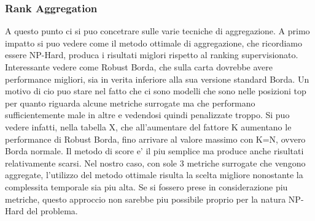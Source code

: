 \subsubsection{Rank Aggregation}
A questo punto ci si puo concetrare sulle varie tecniche di aggregazione. A primo impatto si puo vedere come il metodo ottimale di aggregazione, che ricordiamo essere NP-Hard, produca i risultati miglori rispetto al ranking supervisionato. Interessante vedere come Robust Borda, che sulla carta dovrebbe avere performance migliori, sia in verita inferiore alla sua versione standard Borda. Un motivo di cio puo stare nel fatto che ci sono modelli che sono nelle posizioni top per quanto riguarda alcune metriche surrogate ma che performano sufficientemente male in altre e vedendosi quindi penalizzate troppo.
Si puo vedere infatti, nella tabella X, che all'aumentare del fattore K aumentano le performance di Robust Borda, fino arrivare al valore massimo con K=N, ovvero Borda normale.
Il metodo di score e' il piu semplice ma produce anche risultati relativamente scarsi. Nel nostro caso, con sole 3 metriche surrogate che vengono aggregate, l'utilizzo del metodo ottimale risulta la scelta migliore nonostante la complessita temporale sia piu alta. Se si fossero prese in considerazione piu metriche, questo approccio non sarebbe piu possibile proprio per la natura NP-Hard del problema.


